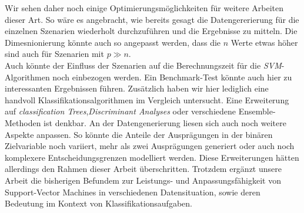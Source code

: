 \documentclass[
]{article}
\begin{document}
Wir sehen daher noch einige Optimierungsmöglichkeiten für weitere
Arbeiten dieser Art. So wäre es angebracht, wie bereits gesagt die
Datengererierung für die einzelnen Szenarien wiederholt durchzuführen
und die Ergebnisse zu mitteln. Die Dimesnionierung könnte auch so
angepasst werden, dass die \(n\) Werte etwas höher sind auch für
Szenarien mit \(p \gg n\).\\
Auch könnte der Einfluss der Szenarien auf die Berechnungszeit für die
\textit{SVM}-Algorithmen noch einbezogen werden. Ein Benchmark-Test
könnte auch hier zu interessanten Ergebnissen führen. Zusätzlich haben
wir hier lediglich eine handvoll Klassifikationsalgorithmen im Vergleich
untersucht. Eine Erweiterung auf
\textit{classification Trees},\textit{Discriminant Analyses} oder
verschiedene Ensemble-Methoden ist denkbar. An der Datengenerierung
liesen sich auch noch weitere Aspekte anpassen. So könnte die Anteile
der Ausprägungen in der binären Zielvariable noch variiert, mehr als
zwei Ausprägungen generiert oder auch noch komplexere
Entscheidungsgrenzen modelliert werden. Diese Erweiterungen hätten
allerdings den Rahmen dieser Arbeit überschritten. Trotzdem ergänzt
unsere Arbeit die bisherigen Befundem zur Leistungs- und
Anpassungsfähigkeit von Support-Vector Machines in verschiedenen
Datensituation, sowie deren Bedeutung im Kontext von
Klassifikationsaufgaben.

\printbibliography
\end{document}
